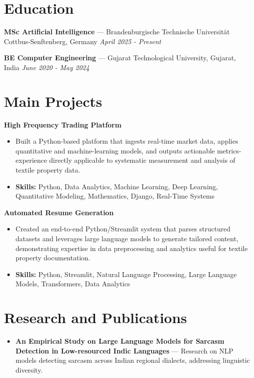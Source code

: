 \documentclass[a4paper,10pt]{article}
\begin{document}
\section*{Education}
\textbf{MSc Artificial Intelligence} — Brandenburgische Technische Universität Cottbus-Senftenberg, Germany \hfill \textit{April 2025 - Present}\par
\vspace{1.5pt}
\textbf{BE Computer Engineering} — Gujarat Technological University, Gujarat, India \hfill \textit{June 2020 - May 2024}\par

\section*{Main Projects}
\textbf{High Frequency Trading Platform}\par
\vspace{1pt}
\begin{itemize}
  \item Built a Python-based platform that ingests real-time market data, applies quantitative and machine-learning models, and outputs actionable metrics-experience directly applicable to systematic measurement and analysis of textile property data.
  \item \textbf{Skills:} Python, Data Analytics, Machine Learning, Deep Learning, Quantitative Modeling, Mathematics, Django, Real-Time Systems
\end{itemize}
\vspace{3pt}
\textbf{Automated Resume Generation}\par
\vspace{1pt}
\begin{itemize}
  \item Created an end-to-end Python/Streamlit system that parses structured datasets and leverages large language models to generate tailored content, demonstrating expertise in data preprocessing and analytics useful for textile property documentation.
  \item \textbf{Skills:} Python, Streamlit, Natural Language Processing, Large Language Models, Transformers, Data Analytics
\end{itemize}

\section*{Research and Publications}
\begin{itemize}
\item \textbf{An Empirical Study on Large Language Models for Sarcasm Detection in Low-resourced Indic Languages} — Research on NLP models detecting sarcasm across Indian regional dialects, addressing linguistic diversity.
\end{itemize}
\end{document}
